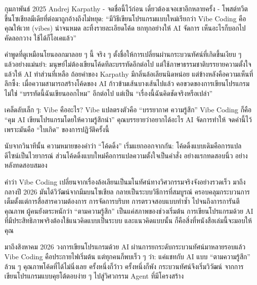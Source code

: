 


กุมภาพันธ์ 2025 Andrej Karpathy - จดชื่อนี้ไว้ก่อน เดี๋ยวต้องเจอเขาอีกหลายครั้ง - โพสต์ทวีตขึ้นโซเชียลมีเดียที่ต่อมาถูกอ้างถึงไม่หยุด: “มีวิธีเขียนโปรแกรมแบบใหม่เรียกว่า Vibe Coding คือคุณให้เวท (vibes) นำจนหมด ละทิ้งรายละเอียดโค้ด ยกทุกอย่างให้ AI จัดการ เห็นอะไรก็บอกไป คัดลอกวาง ใช้ได้ก็โอเคแล้ว”

คำพูดที่ดูเหมือนโยนออกมาลอย ๆ นี้ จริง ๆ ตั้งชื่อให้การเปลี่ยนผ่านกระบวนทัศน์ที่เกิดขึ้นเงียบ ๆ แล้วอย่างแม่นยำ: มนุษย์ไม่ต้องเขียนโค้ดทีละบรรทัดอีกต่อไป แต่ใช้ภาษาธรรมชาติบรรยายความตั้งใจ แล้วให้ AI ทำส่วนที่เหลือ ถ้อยคำของ Karpathy มีกลิ่นล้อเลียนนิดหน่อย แต่ข้างหลังคือความเห็นที่ลึกซึ้ง: เมื่อความสามารถสร้างโค้ดของ AI ก้าวข้ามเส้นบางเส้นไปแล้ว คอขวดของการเขียนโปรแกรมไม่ใช่ “บรรทัดนี้ฉันเขียนออกไหม” อีกต่อไป แต่เป็น “เรื่องนี้ฉันคิดชัดจริงหรือเปล่า”

\begin{tcbinfo}{เคล็ดลับเล็ก ๆ: Vibe คืออะไร?}
Vibe แปลตรงตัวคือ “บรรยากาศ ความรู้สึก” Vibe Coding ก็คือ “คุม AI เขียนโปรแกรมโดยให้ความรู้สึกนำ” คุณบรรยายว่าอยากได้อะไร AI จัดการทำให้ จดคำนี้ไว้ เพราะมันคือ “ใบเกิด” ของการปฏิวัติครั้งนี้

\end{tcbinfo}

นับจากวินาทีนั้น ความหมายของคำว่า “โค้ดดิ้ง” เริ่มแยกออกจากกัน: โค้ดดิ้งแบบเดิมคือการแปลดีไซน์เป็นไวยากรณ์ ส่วนโค้ดดิ้งแบบใหม่คือการแปลความตั้งใจเป็นคำสั่ง อย่างแรกทดสอบนิ้ว อย่างหลังทดสอบสมอง

คำว่า Vibe Coding เปลี่ยนจากเรื่องล้อเลียนเป็นมโนทัศน์ทางวิศวกรรมจริงจังอย่างรวดเร็ว มาถึงกลางปี 2026 มันได้วิวัฒน์จากมีมบนโซเชียล กลายเป็นระบบวิธีการที่สมบูรณ์ ครอบคลุมกระบวนการเต็มตั้งแต่การสื่อสารความต้องการ การจัดการบริบท การตรวจสอบแบบทำซ้ำ ไปจนถึงการการันตีคุณภาพ ผู้คนยังตระหนักว่า “ตามความรู้สึก” เป็นแค่สภาพของช่วงเริ่มต้น การเขียนโปรแกรมด้วย AI ที่มีประสิทธิภาพจริงต้องใช้แนวคิดแบบเป็นระบบ และแนวคิดแบบนั้น ก็คือสิ่งที่หนังสือเล่มนี้จะมอบให้คุณ


มาถึงสิงหาคม 2026 วงการเขียนโปรแกรมด้วย AI ผ่านการยกระดับกระบวนทัศน์มาหลายรอบแล้ว Vibe Coding คือประกายไฟเริ่มต้น แต่ทุกคนก็พบเร็ว ๆ ว่า: แค่แชทกับ AI แบบ “ตามความรู้สึก” ล้วน ๆ คุณภาพโค้ดที่ได้ไม่นิ่งเลย ครั้งหนึ่งก็ว้าว ครั้งหนึ่งก็พัง กระบวนทัศน์จึงเริ่มวิวัฒน์ จากการเขียนโปรแกรมแบบคุยโต้ตอบง่าย ๆ ไปสู่วิศวกรรม Agent ที่มีโครงสร้าง

